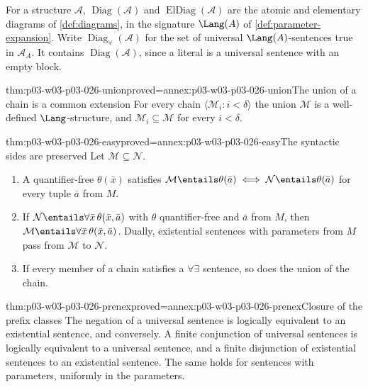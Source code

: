 For a structure \(\mathcal A\), \(\operatorname{Diag}(\mathcal A)\) and
\(\operatorname{ElDiag}(\mathcal A)\) are the atomic and elementary diagrams
of \cref{def:diagrams}, in the signature \(\Lang(A)\) of
\cref{def:parameter-expansion}.  Write
\(\operatorname{Diag}_{\forall}(\mathcal A)\) for the set of universal
\(\Lang(A)\)-sentences true in \(\mathcal A_A\).  It contains
\(\operatorname{Diag}(\mathcal A)\), since a literal is a universal sentence
with an empty block.

\begin{hblemma}{thm:p03-w03-p03-026-union}{proved=annex:p03-w03-p03-026-union}{The union of a chain is a common extension}
For every chain \(\langle\mathcal M_i:i<\delta\rangle\) the union
\(\mathcal M\) is a well-defined \(\Lang\)-structure, and
\(\mathcal M_i\subseteq\mathcal M\) for every \(i<\delta\).
\end{hblemma}

\begin{hblemma}{thm:p03-w03-p03-026-easy}{proved=annex:p03-w03-p03-026-easy}{The syntactic sides are preserved}
Let \(\mathcal M\subseteq\mathcal N\).
\begin{enumerate}
 \item A quantifier-free \(\theta(\bar x)\) satisfies
       \(\mathcal M\entails\theta(\bar a)\iff\mathcal N\entails\theta(\bar a)\)
       for every tuple \(\bar a\) from \(M\).
 \item If \(\mathcal N\entails\forall\bar x\,\theta(\bar x,\bar a)\) with
       \(\theta\) quantifier-free and \(\bar a\) from \(M\), then
       \(\mathcal M\entails\forall\bar x\,\theta(\bar x,\bar a)\).  Dually,
       existential sentences with parameters from \(M\) pass from
       \(\mathcal M\) to \(\mathcal N\).
 \item If every member of a chain satisfies a \(\forall\exists\) sentence,
       so does the union of the chain.
\end{enumerate}
\end{hblemma}

\begin{hblemma}{thm:p03-w03-p03-026-prenex}{proved=annex:p03-w03-p03-026-prenex}{Closure of the prefix classes}
The negation of a universal sentence is logically equivalent to an
existential sentence, and conversely.  A finite conjunction of universal
sentences is logically equivalent to a universal sentence, and a finite
disjunction of existential sentences to an existential sentence.  The same
holds for sentences with parameters, uniformly in the parameters.
\end{hblemma}

